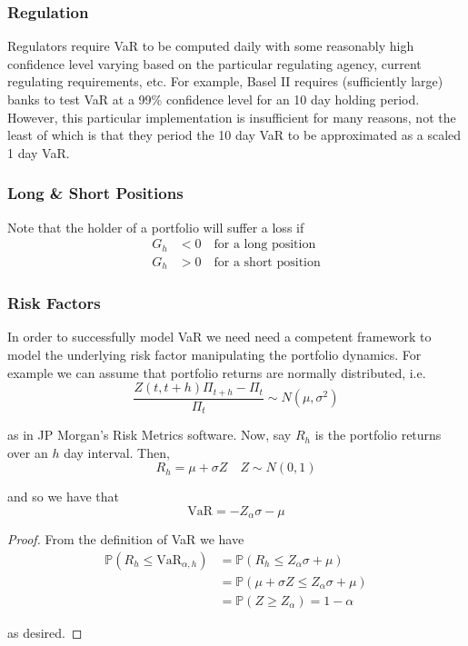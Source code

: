 \documentclass[12pt]{article}
\newlength\tindent
\renewcommand{\indent}{\hspace*{\tindent}}
\renewcommand{\P}{\mathbb P}
\begin{document}
\subsubsection{Regulation}

\indent Regulators require VaR to be computed daily with some reasonably high confidence level varying based on the particular regulating agency, current regulating requirements, etc. For example, Basel II requires (sufficiently large) banks to test VaR at a 99\% confidence level for an 10 day holding period. However, this particular implementation is insufficient for many reasons, not the least of which is that they period the 10 day VaR to be approximated as a scaled 1 day VaR.

\subsubsection{Long \& Short Positions}

Note that the holder of a portfolio will suffer a loss if
\begin{align*}
	G_h &< 0 \quad \text{for a long position} \\
	G_h &> 0 \quad \text{for a short position}
\end{align*}

\subsubsection{Risk Factors}

\indent In order to successfully model VaR we need need a competent framework to model the underlying risk factor manipulating the portfolio dynamics. For example we can assume that portfolio returns are normally distributed, i.e.
\begin{equation*}
		\frac{ Z(t, t + h) \Pi_{t + h} - \Pi_t }{ \Pi_t } \sim N \left( \mu, \sigma^2 \right)
\end{equation*}

as in JP Morgan's Risk Metrics software. Now, say $R_h$ is the portfolio returns over an $h$ day interval. Then,
\begin{equation*}
	R_h = \mu + \sigma Z \quad Z \sim N(0, 1)
\end{equation*}

and so we have that
\begin{equation*}
	\text{VaR} = -Z_\alpha \sigma - \mu
\end{equation*}

\begin{proof} From the definition of VaR we have
\begin{align*}
	\P(R_h \leq \text{VaR}_{\alpha, h}) &= \P ( R_h \leq Z_\alpha\sigma + \mu ) \\
	&= \P ( \mu + \sigma Z \leq Z_\alpha \sigma + \mu) \\
	&= \P (Z \geq Z_\alpha) = 1 - \alpha
\end{align*}

as desired.
\end{proof}
\end{document}
